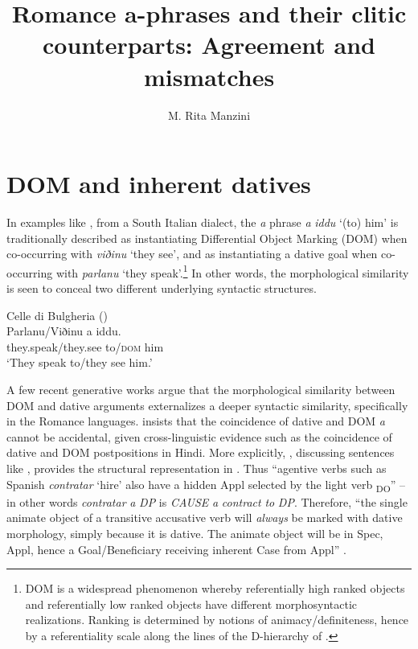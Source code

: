 \documentclass[output=paper,colorlinks,citecolor=brown,nonflat]{./langscibook}
\author{M. Rita Manzini\affiliation{Università di Firenze}}
\title{Romance a-phrases and their clitic counterparts: Agreement and mismatches}
\begin{document}
\maketitle
{}



\section{DOM and inherent datives}\label{sec:manzini:1}

In examples like , from a South Italian dialect, the \textit{a} phrase \textit{a} \textit{iddu} ‘(to) him’ is traditionally described as instantiating Differential Object Marking (DOM) when co-occurring with \textit{viðinu} ‘they see’, and as instantiating a dative goal when co-occurring with \textit{parlanu} ‘they speak’.\footnote{DOM is a widespread phenomenon \citep{Bossong1985} whereby referentially high ranked objects and referentially low ranked objects have different morphosyntactic realizations. Ranking is determined by notions of animacy/definiteness, hence by a referentiality scale along the lines of the D-hierarchy of \citet{Kiparsky2008}.}  In other words, the morphological similarity is seen to conceal two different underlying syntactic structures.

\ea%
    \label{ex:manzini:1}
    {Celle di Bulgheria (\citealt{ManziniSavoia2005})}\\
    \gll Parlanu/Viðinu a iddu.\\
        they.speak/they.see to/\textsc{dom} him\\
    \glt ‘They speak to/they see him.’
\z

A few recent generative works argue that the morphological similarity between DOM and dative arguments externalizes a deeper syntactic similarity, specifically in the Romance languages. \citet{Torrego1998} insists that the coincidence of dative and DOM \textit{a} cannot be accidental, given cross-linguistic evidence such as the coincidence of dative and DOM postpositions in Hindi. More explicitly, \citet{Torrego2010}, discussing sentences like , provides the structural representation in . Thus “agentive verbs such as Spanish \textit{contratar} ‘hire’ also have a hidden Appl selected by the light verb \liv\textsubscript{DO}” – in other words \textit{contratar} \textit{a} \textit{DP} is \textit{CAUSE} \textit{a} \textit{contract} \textit{to} \textit{DP}. Therefore, “the single animate object of a transitive accusative verb will \textit{always} be marked with dative morphology, simply because it is dative. The animate object will be in Spec, Appl, hence a Goal/Beneficiary receiving inherent Case from Appl” \citep[462]{Torrego2010}.
\end{document}
